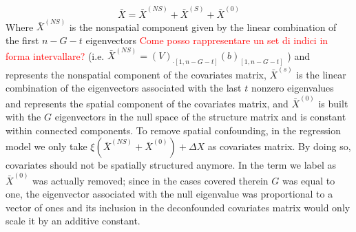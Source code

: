 \documentclass{article}
\begin{document}
$$
\bar{X} = \bar{X}^{(NS)} + \bar{X}^{(S)} + \bar{X}^{(0)}
$$
Where $\bar{X}^{(NS)}$ is the nonspatial component given by the linear combination of the first $n-G-t$ eigenvectors \textcolor{red}{Come posso rappresentare un set di indici in forma intervallare?} (i.e. $\bar{X}^{(NS)} = (V)_{\cdot[1, n-G-t]}(b)_{[1, n-G-t]}$ ) and represents the nonspatial component of the covariates matrix, $\bar{X}^{(s)}$ is the linear combination of the eigenvectors associated with the last $t$ nonzero eigenvalues and represents the spatial component of the covariates matrix, and $\bar{X}^{(0)}$ is built with the $G$ eigenvectors in the null space of the structure matrix and is constant within connected components. To remove spatial confounding, in the regression model we only take $\xi \left(\bar{X}^{(NS)} + \bar{X}^{(0)}\right) + \Delta X$ as covariates matrix. By doing so, covariates should not be spatially structured anymore. In \cite{Urdangarin24} the term we label as $\bar{X}^{(0)}$ was actually removed; since in the cases covered therein $G$ was equal to one, the eigenvector associated with the null eigenvalue was proportional to a vector of ones and its inclusion in the deconfounded covariates matrix would only scale it by an additive constant.\\










\end{document}
